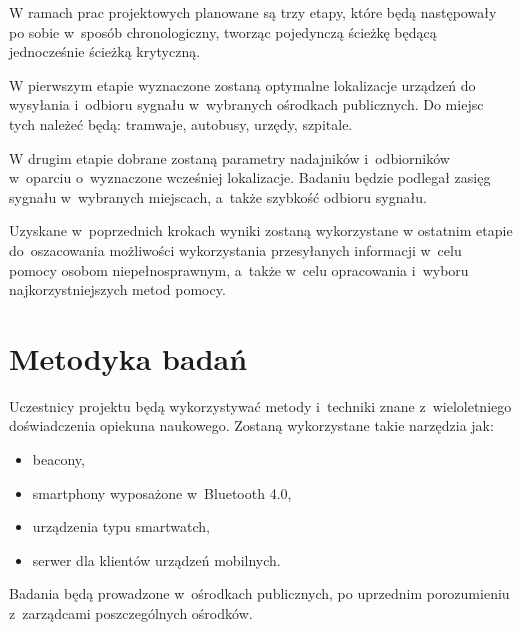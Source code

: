 \documentclass[a4paper]{article}
\begin{document}
W ramach prac projektowych planowane są trzy etapy, które będą następowały po sobie w~sposób chronologiczny, tworząc pojedynczą ścieżkę będącą jednocześnie ścieżką krytyczną.

W pierwszym etapie wyznaczone zostaną optymalne lokalizacje urządzeń do wysyłania i~odbioru sygnału w~wybranych ośrodkach publicznych. Do miejsc tych należeć będą: tramwaje, autobusy, urzędy, szpitale. 

W drugim etapie dobrane zostaną parametry nadajników i~odbiorników w~oparciu o~wyznaczone wcześniej lokalizacje. Badaniu będzie podlegał zasięg sygnału w~wybranych miejscach, a~także szybkość odbioru sygnału. 

Uzyskane w~poprzednich krokach wyniki zostaną wykorzystane w ostatnim etapie do~oszacowania możliwości wykorzystania przesyłanych informacji w~celu pomocy osobom niepełnosprawnym, a~także w~celu opracowania i~wyboru najkorzystniejszych metod pomocy.

\section{Metodyka badań}
Uczestnicy projektu będą wykorzystywać metody i~techniki znane z~wieloletniego doświadczenia opiekuna naukowego. Zostaną wykorzystane takie narzędzia jak:
\begin{itemize}
\item beacony,
\item smartphony wyposażone w~Bluetooth 4.0,
\item urządzenia typu smartwatch,
\item serwer dla klientów urządzeń mobilnych.
\end{itemize} 

Badania będą prowadzone w~ośrodkach publicznych, po uprzednim porozumieniu z~zarządcami poszczególnych ośrodków.
\end{document}
